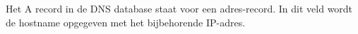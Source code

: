Het A record in de DNS database staat voor een adres-record. In dit veld wordt de hostname opgegeven met het bijbehorende IP-adres.

